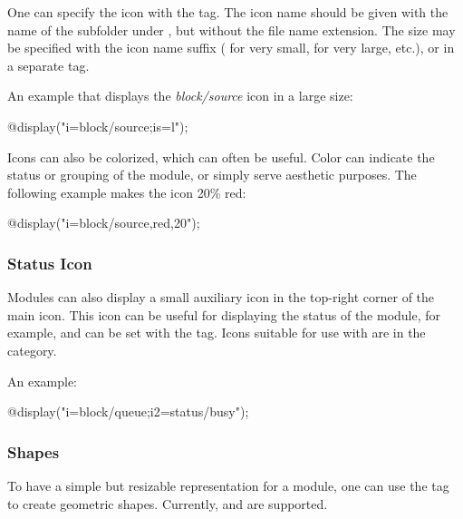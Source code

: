 One can specify the icon with the  tag. The icon name should be given
with the name of the subfolder under , but without the file name
extension. The size may be specified with the icon name suffix ( for
very small,  for very large, etc.), or in a separate  tag.

An example that displays the \textit{block/source} icon in a large size:

\begin{ned}
@display("i=block/source;is=l");
\end{ned}

Icons can also be colorized, which can often be useful. Color can indicate the
status or grouping of the module, or simply serve aesthetic purposes. The
following example makes the icon 20\% red:

\begin{ned}
@display("i=block/source,red,20");
\end{ned}

\begin{center}
\end{center}

\subsubsection{Status Icon}
\label{sec:graphics:submodule-status-icon}

Modules can also display a small auxiliary icon in the top-right corner of the
main icon. This icon can be useful for displaying the status of the module, for
example, and can be set with the  tag. Icons suitable for use with
 are in the  category.

An example:

\begin{ned}
@display("i=block/queue;i2=status/busy");
\end{ned}

\begin{center}
\end{center}

\subsubsection{Shapes}
\label{sec:graphics:submodule-shapes}

To have a simple but resizable representation for a module, one can use the
 tag to create geometric shapes. Currently,  and
 are supported.

